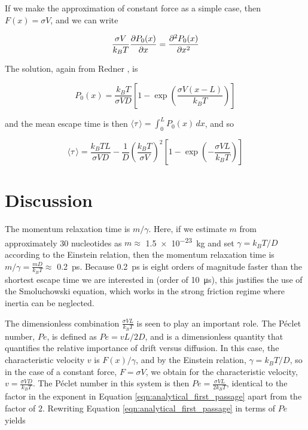 If we make the approximation of constant force as a simple case, then $F(x) = \sigma V$, and we can write

\begin{equation}
\frac{\sigma V}{k_B T} \frac{\partial P_0(x)}{\partial x} = \frac{\partial^2 P_0(x)}{\partial x^2}
\label{eqn:biased_diffusion2}
\end{equation}

The solution, again from Redner \citep{Redner2001}, is

\begin{equation}
P_0(x) = \frac{k_B T}{\sigma V D} \left[ 1 - \exp{ \left( \frac{\sigma V (x-L)}{k_B T} \right) } \right]
\label{eqn:biased_diffusion_solution}
\end{equation}

\noindent
and the mean escape time is then $\langle \tau \, \rangle = \int_{0}^{L} P_0(x) \,dx$, and so

\begin{equation}
\langle \tau \, \rangle = \frac{k_B T L}{\sigma V D} - \frac{1}{D} \left( \frac{k_B T}{\sigma V} \right) ^2 \left[ 1 - \exp{ \left( - \frac{\sigma V L}{k_B T} \right) } \right]
\label{eqn:analytical_first_passage}
\end{equation}

\section{Discussion}

The momentum relaxation time is $m/\gamma$.  Here, if we estimate $m$ from approximately 30 nucleotides as $m \approx $ \SI{1.5e-23}{\kg} and set $\gamma = k_B T / D$ according to the Einstein relation, then the momentum relaxation time is $m/\gamma = \frac{m D}{k_B T} \approx $ \SI{0.2}{\pico\s}.  Because \SI{0.2}{\pico\s} is eight orders of magnitude faster than the shortest escape time we are interested in (order of \SI{10}{\us}), this justifies the use of the Smoluchowski equation, which works in the strong friction regime where inertia can be neglected.

The dimensionless combination $\frac{\sigma V L}{k_B T}$ is seen to play an important role.  The Péclet number, $Pe$, is defined as $Pe = v L / 2 D$, and is a dimensionless quantity that quantifies the relative importance of drift versus diffusion.  In this case, the characteristic velocity $v$ is $F(x)/\gamma$, and by the Einstein relation, $\gamma=k_B T / D$, so in the case of a constant force, $F = \sigma V$, we obtain for the characteristic velocity, $v=\frac{\sigma V D}{k_B T}$.  The Péclet number in this system is then $Pe=\frac{\sigma V L}{2 k_B T}$, identical to the factor in the exponent in Equation \ref{eqn:analytical_first_passage} apart from the factor of $2$.  Rewriting Equation \ref{eqn:analytical_first_passage} in terms of $Pe$ yields \citep{Redner2001}

